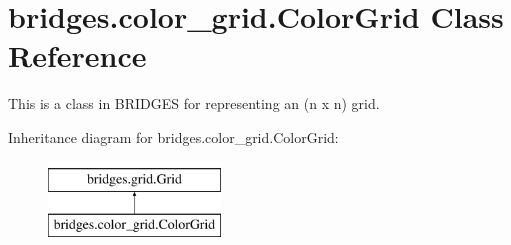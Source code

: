 \hypertarget{classbridges_1_1color__grid_1_1_color_grid}{}\section{bridges.\+color\+\_\+grid.\+Color\+Grid Class Reference}
\label{classbridges_1_1color__grid_1_1_color_grid}


This is a class in B\+R\+I\+D\+G\+E\+S for representing an (n x n) grid.  


Inheritance diagram for bridges.\+color\+\_\+grid.\+Color\+Grid\+:\begin{figure}[H]
\begin{center}
\leavevmode
\includegraphics[height=2.000000cm]{classbridges_1_1color__grid_1_1_color_grid}
\end{center}
\end{figure}
